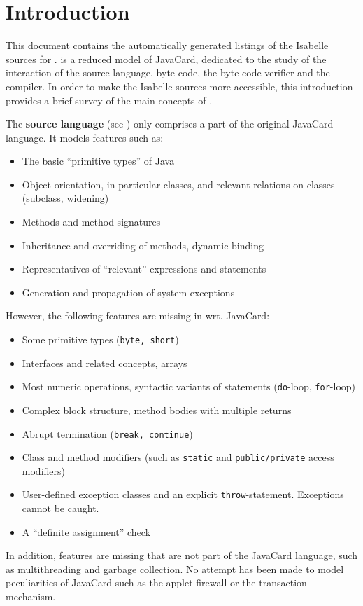 
\section*{Introduction}
\label{sec:introduction}

This document contains the automatically generated listings of the
Isabelle sources for \mJava. \mJava{} is a reduced model of JavaCard,
dedicated to the study of the interaction of the source language, byte
code, the byte code verifier and the compiler. In order to make the
Isabelle sources more accessible, this introduction provides a brief
survey of the main concepts of \mJava.

The \mJava{} \textbf{source language} (see )
only comprises a part of the original JavaCard language. It models
features such as:
\begin{itemize}
\item The basic ``primitive types'' of Java 
\item Object orientation, in particular classes, and relevant
  relations on classes (subclass, widening)

\item Methods and method signatures
\item Inheritance and overriding of methods, dynamic binding

\item Representatives of ``relevant'' expressions and statements 
\item Generation and propagation of system exceptions
\end{itemize}

However, the following features are missing in \mJava{} wrt.{} JavaCard:
\begin{itemize}
\item Some primitive types (\texttt{byte, short})
\item Interfaces and related concepts, arrays
\item Most numeric operations, syntactic variants of statements
  (\texttt{do}-loop, \texttt{for}-loop)
\item Complex block structure, method bodies with multiple returns
\item Abrupt termination (\texttt{break, continue})
\item Class and method modifiers (such as \texttt{static} and
  \texttt{public/private} access modifiers)
\item User-defined exception classes and an explicit
  \texttt{throw}-statement. Exceptions cannot be caught.
\item A ``definite assignment'' check
\end{itemize}
In addition, features are missing that are not part of the JavaCard
language, such as multithreading and garbage collection. No attempt
has been made to model peculiarities of JavaCard such as the applet
firewall or the transaction mechanism.

